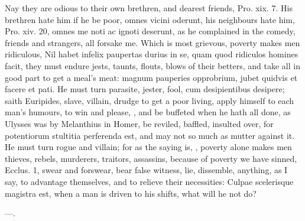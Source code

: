 {Nay they are odious to their own brethren, and dearest friends, Pro.
xix. 7. His brethren hate him if he be poor, omnes vicini
oderunt, his neighbours hate him, Pro. xiv. 20, omnes me noti ac
ignoti deserunt, as he complained in the comedy, friends and strangers,
all forsake me. Which is most grievous, poverty makes men ridiculous,
Nil habet infelix paupertas durius in se, quam quod ridiculos homines
facit, they must endure jests, taunts, flouts, blows of their
betters, and take all in good part to get a meal's meat: magnum
pauperies opprobrium, jubet quidvis et facere et pati. He must turn
parasite, jester, fool, cum desipientibus desipere; saith
Euripides, slave, villain, drudge to get a poor living, apply
himself to each man's humours, to win and please, \etc{}, and be buffeted
when he hath all done, as Ulysses was by Melanthius in Homer, be
reviled, baffled, insulted over, for potentiorum stultitia
perferenda est, and may not so much as mutter against it. He must turn
rogue and villain; for as the saying is, ,
poverty alone makes men thieves, rebels, murderers, traitors,
assassins, because of poverty we have sinned, Ecclus.  1, swear
and forswear, bear false witness, lie, dissemble, anything, as I say,
to advantage themselves, and to relieve their necessities: 
Culpae scelerisque magistra est, when a man is driven to his shifts,
what will he not do?

---.

}
